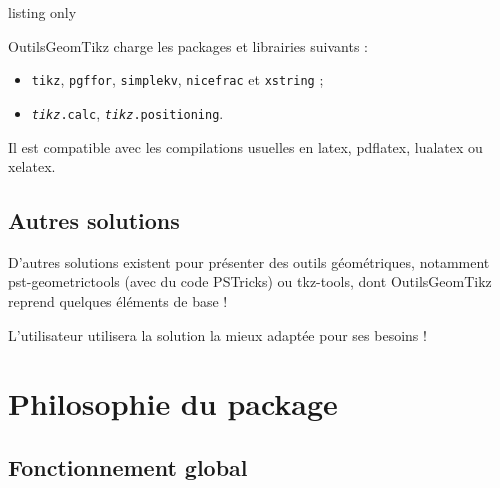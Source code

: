 \documentclass[french,a4paper,11pt]{article}
\providecommand\PSTricks{\textsf{PSTricks}\xspace}
\begin{document}
\begin{PresentationCode}{listing only}
\usepackage{OutilsGeomTikz}
\end{PresentationCode}

\begin{noteblock}
\textsf{OutilsGeomTikz} charge les packages et librairies suivants :

\begin{itemize}
	\item \texttt{tikz}, \texttt{pgffor}, \texttt{simplekv}, \texttt{nicefrac} et \texttt{xstring} ;
	\item \texttt{\textit{tikz}.calc}, \texttt{\textit{tikz}.positioning}.
\end{itemize}

Il est compatible avec les compilations usuelles en \textsf{latex}, \textsf{pdflatex}, \textsf{lualatex} ou \textsf{xelatex}.
\end{noteblock}

\subsection{Autres solutions}

\begin{noteblock}
D'autres solutions existent pour présenter des outils géométriques, notamment \textsf{pst-geometrictools}\footnotemark{} (avec du code \PSTricks) ou \textsf{tkz-tools}\footnotemark{}, dont \textsf{OutilsGeomTikz} reprend quelques éléments de base  !

\smallskip

L'utilisateur utilisera la solution la mieux adaptée pour ses besoins !
\end{noteblock}

\pagebreak

\section{Philosophie du package}

\subsection{Fonctionnement global}
\end{document}
